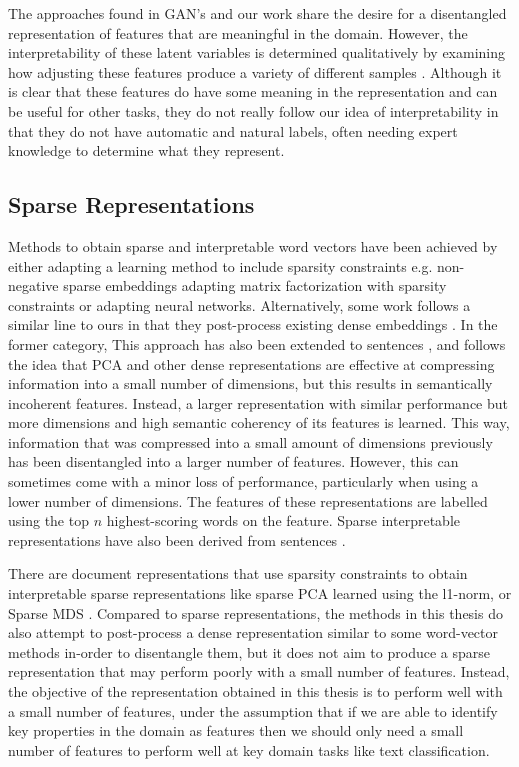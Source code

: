 The approaches found in GAN's and our work share the desire for a disentangled representation of features that are meaningful in the domain. However, the interpretability of these latent variables is determined qualitatively by examining how adjusting these features produce a variety of different samples \cite{Hsu2017}. Although it is clear that these features do have some meaning in the representation and can be useful for other tasks, they do not really follow our idea of interpretability in that they do not have automatic and natural labels, often needing expert knowledge to determine what they represent.

\subsection{Sparse Representations}

Methods to obtain sparse and interpretable word vectors have been achieved by either adapting a learning method to include sparsity constraints e.g.  non-negative sparse embeddings adapting matrix factorization with  sparsity constraints \cite{Murphya} or \cite{Luo2015} adapting neural networks. Alternatively, some work follows a similar line to ours in that they post-process existing dense embeddings \cite{Subramanian} \cite{Park2017} \cite{Faruqui2015}. In the former category,  This approach has also been extended to sentences \cite{Trifonov2018}, and follows the idea that PCA and other dense representations are effective at compressing information into a small number of dimensions, but this results in semantically incoherent features. Instead, a larger representation with similar performance but more dimensions and high semantic coherency of its features is learned. This way, information that was compressed into a small amount of dimensions previously has been disentangled into a larger number of features.  However, this can sometimes come with a minor loss of performance, particularly when using a lower number of dimensions. The features of these representations are labelled using the top $n$ highest-scoring words on the feature. Sparse interpretable representations have also been derived from sentences \cite{Trifonov}.

There are document representations that use sparsity constraints to obtain interpretable sparse representations like sparse PCA learned using the l1-norm, \cite{H.Zou2006} \cite{Zhang2012} or Sparse MDS \cite{Silva2004}. Compared to sparse representations, the methods in this thesis do also attempt to post-process a dense representation similar to some word-vector methods in-order to disentangle them, but it does not aim to produce a sparse representation that may perform poorly with a small number of features. Instead, the objective of the representation obtained in this thesis is to perform well with a small number of features, under the assumption that if we are able to identify key properties in the domain as features then we should only need a small number of features to perform well at key domain tasks like text classification.  

